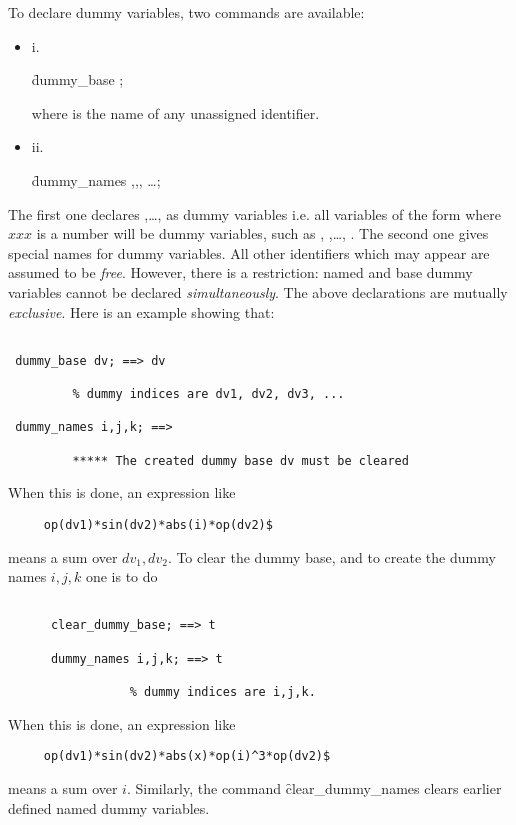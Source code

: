 \hypertarget{command:DUMMY_BASE}{}
\hypertarget{command:DUMMY_NAME}{}
To declare dummy variables, two commands are available:
\begin{itemize}
\item{i.}
\begin{syntax}
     \f{dummy\_base} ;
\end{syntax}
where  is the name of any unassigned identifier.
\item{ii.}
\begin{syntax}
     \f{dummy\_names} ,,, \ldots ;
\end{syntax}
\end{itemize}
The first one  declares ,\ldots, as dummy variables i.e.
all variables of the form  where $xxx$ is a number
will be dummy variables, such as , ,\ldots, .
The second one gives special names for dummy variables.
All other identifiers which may appear are assumed to be \emph{free}.
However, there is a restriction: named and base dummy variables 
cannot be declared \emph{simultaneously}. The above declarations are 
mutually \emph{exclusive}. 
Here is an example  showing that:
\begin{verbatim}

 dummy_base dv; ==> dv

         % dummy indices are dv1, dv2, dv3, ...

 dummy_names i,j,k; ==> 
                 
         ***** The created dummy base dv must be cleared
\end{verbatim}

When this is done, an expression like 
\begin{verbatim}
     op(dv1)*sin(dv2)*abs(i)*op(dv2)$
\end{verbatim}
means a sum over $dv_1,dv_2$.
To clear the dummy base, and to create the dummy names $i,j,k$ one is 
to do
\hypertarget{command:CLEAR_DUMMY_BASE}{}
\begin{verbatim}

      clear_dummy_base; ==> t

      dummy_names i,j,k; ==> t
                
                 % dummy indices are i,j,k.
\end{verbatim}
When this is done, an expression like
\begin{verbatim}
     op(dv1)*sin(dv2)*abs(x)*op(i)^3*op(dv2)$
\end{verbatim}
means a sum over $i$.
Similarly, the command \f{clear\_dummy\_names}
\hypertarget{command:CLEAR_DUMMY_NAMES}{}
clears earlier defined named dummy variables.

